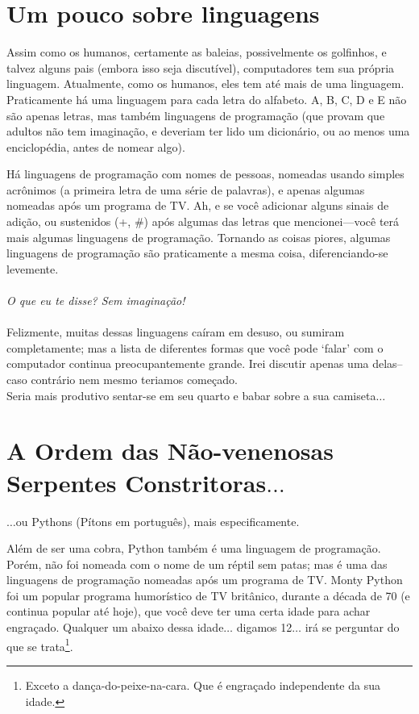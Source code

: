 \section{Um pouco sobre linguagens}

Assim como os humanos, certamente as baleias, possivelmente os golfinhos, e talvez alguns pais (embora isso seja discutível), computadores tem sua própria linguagem. Atualmente, como os humanos, eles tem até mais de uma linguagem. Praticamente há uma linguagem para cada letra do alfabeto. A, B, C, D e E não são apenas letras, mas também linguagens de programação (que provam que adultos não tem imaginação, e deveriam ter lido um dicionário, ou ao menos uma enciclopédia, antes de nomear algo).

Há linguagens de programação com nomes de pessoas, nomeadas usando simples acrônimos (a primeira letra de uma série de palavras), e apenas algumas nomeadas após um programa de TV. Ah, e se você adicionar alguns sinais de adição, ou sustenidos (+, \#) após algumas das letras que mencionei---você terá mais algumas linguagens de programação. Tornando as coisas piores, algumas linguagens de programação são praticamente a mesma coisa, diferenciando-se levemente.
\\
\\
\emph{O que eu te disse?  Sem imaginação!}
\\
\\
Felizmente, muitas dessas linguagens caíram em desuso, ou sumiram completamente; mas a lista de diferentes formas que você pode `falar' com o computador continua preocupantemente grande. Irei discutir apenas uma delas--caso contrário nem mesmo teriamos começado.
\\
Seria mais produtivo sentar-se em seu quarto e babar sobre a sua camiseta$\ldots$

\section{A Ordem das Não-venenosas \\Serpentes Constritoras$\ldots$}

$\ldots$ou Pythons (Pítons em português), mais especificamente.

Além de ser uma cobra, Python também é uma linguagem de programação. Porém, não foi nomeada com o nome de um réptil sem patas; mas é uma das linguagens de programação nomeadas após um programa de TV. Monty Python foi um popular programa humorístico de TV britânico, durante a década de 70 (e continua popular até hoje), que você deve ter uma certa idade para achar engraçado. Qualquer um abaixo dessa idade$\ldots$ digamos 12$\ldots$ irá se perguntar do que se trata\footnote{Exceto a dança-do-peixe-na-cara. Que é engraçado independente da sua idade.}.

